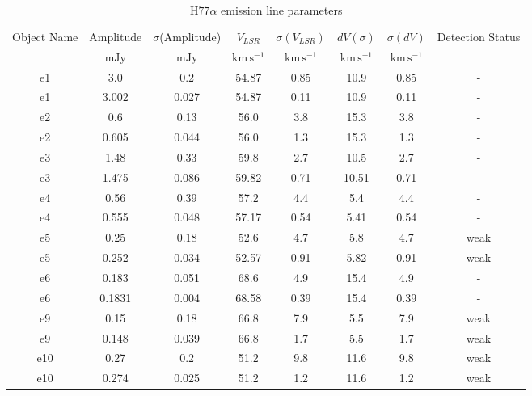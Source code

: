 \begin{table*}[htp]
\caption{H$77\alpha$ emission line parameters}
\begin{tabular}{cccccccc}
\label{tab:h77a}
Object Name & Amplitude & $\sigma$(Amplitude) & $V_{LSR}$ & $\sigma(V_{LSR})$ & $dV (\sigma)$ & $\sigma(dV)$ & Detection Status \\
 & $\mathrm{mJy}$ & $\mathrm{mJy}$ & $\mathrm{km\,s^{-1}}$ & $\mathrm{km\,s^{-1}}$ & $\mathrm{km\,s^{-1}}$ & $\mathrm{km\,s^{-1}}$ &  \\
\hline
e1 & 3.0 & 0.2 & 54.87 & 0.85 & 10.9 & 0.85 & - \\
e1 & 3.002 & 0.027 & 54.87 & 0.11 & 10.9 & 0.11 & - \\
e2 & 0.6 & 0.13 & 56.0 & 3.8 & 15.3 & 3.8 & - \\
e2 & 0.605 & 0.044 & 56.0 & 1.3 & 15.3 & 1.3 & - \\
e3 & 1.48 & 0.33 & 59.8 & 2.7 & 10.5 & 2.7 & - \\
e3 & 1.475 & 0.086 & 59.82 & 0.71 & 10.51 & 0.71 & - \\
e4 & 0.56 & 0.39 & 57.2 & 4.4 & 5.4 & 4.4 & - \\
e4 & 0.555 & 0.048 & 57.17 & 0.54 & 5.41 & 0.54 & - \\
e5 & 0.25 & 0.18 & 52.6 & 4.7 & 5.8 & 4.7 & weak \\
e5 & 0.252 & 0.034 & 52.57 & 0.91 & 5.82 & 0.91 & weak \\
e6 & 0.183 & 0.051 & 68.6 & 4.9 & 15.4 & 4.9 & - \\
e6 & 0.1831 & 0.004 & 68.58 & 0.39 & 15.4 & 0.39 & - \\
e9 & 0.15 & 0.18 & 66.8 & 7.9 & 5.5 & 7.9 & weak \\
e9 & 0.148 & 0.039 & 66.8 & 1.7 & 5.5 & 1.7 & weak \\
e10 & 0.27 & 0.2 & 51.2 & 9.8 & 11.6 & 9.8 & weak \\
e10 & 0.274 & 0.025 & 51.2 & 1.2 & 11.6 & 1.2 & weak \\
\hline
\end{tabular}
\end{table*}
